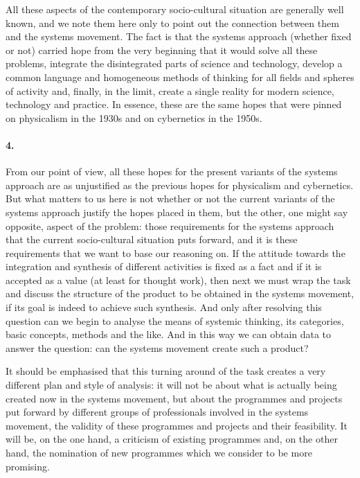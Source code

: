 \documentclass[11pt,a4paper]{article}
\begin{document}
All these aspects of the contemporary socio-cultural situation are generally
well known, and we note them here only to point out the connection between
them and the systems movement. The fact is that the systems approach (whether
fixed or not) carried hope from the very beginning that it would solve all
these problems, integrate the disintegrated parts of science and technology,
develop a common language and homogeneous methods of thinking for all fields
and spheres of activity and, finally, in the limit, create a single reality
for modern science, technology and practice. In essence, these are the same
hopes that were pinned on physicalism in the 1930s and on cybernetics in the
1950s.

\paragraph{4.}
From our point of view, all these hopes for the present variants of the
systems approach are as unjustified as the previous hopes for physicalism and
cybernetics. But what matters to us here is not whether or not the current
variants of the systems approach justify the hopes placed in them, but the
other, one might say opposite, aspect of the problem: those requirements for
the systems approach that the current socio-cultural situation puts forward,
and it is these requirements that we want to base our reasoning on. If the
attitude towards the integration and synthesis of different activities is
fixed as a fact and if it is accepted as a value (at least for thought work),
then next we must wrap the task and discuss the structure of the product to be
obtained in the systems movement, if its goal is indeed to achieve such
synthesis. And only after resolving this question can we begin to analyse the
means of systemic thinking, its categories, basic concepts, methods and the
like. And in this way we can obtain data to answer the question: can the
systems movement create such a product?

It should be emphasised that this turning around of the task creates a very
different plan and style of analysis: it will not be about what is actually
being created now in the systems movement, but about the programmes and
projects put forward by different groups of professionals involved in the
systems movement, the validity of these programmes and projects and their
feasibility. It will be, on the one hand, a criticism of existing programmes
and, on the other hand, the nomination of new programmes which we consider to
be more promising.
\end{document}
